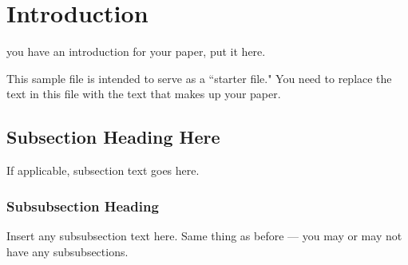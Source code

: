 \section{Introduction}
 you have an introduction for your paper, put it
here.

This sample file is intended to serve as a ``starter file."  You
need to replace the text in this file with the text that makes up
your paper.

\subsection{Subsection Heading Here}
If applicable, subsection text goes here.

\subsubsection{Subsubsection Heading}
Insert any subsubsection text here.  Same thing as before --- you may
or may not have any subsubsections.
